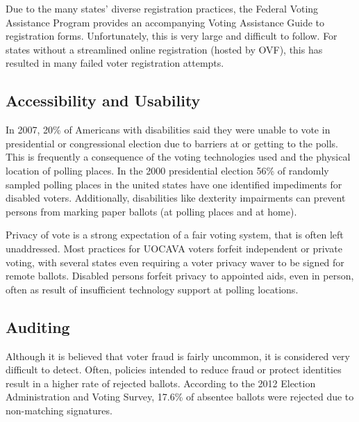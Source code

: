 
Due to the many states' diverse registration practices, the Federal Voting Assistance Program provides an accompanying Voting Assistance Guide to registration forms. Unfortunately, this is very large and difficult to follow. For states without a streamlined online registration (hosted by OVF), this has resulted in many failed voter registration attempts.


\subsection{Accessibility and Usability}

In 2007, 20\% of Americans with disabilities said they were unable to vote in presidential or congressional election due to barriers at or getting to the polls. This is frequently a consequence of the voting technologies used and the physical location of polling places. In the 2000 presidential election 56\% of randomly sampled polling places in the united states have one identified impediments for disabled voters. Additionally, disabilities like dexterity impairments can prevent persons from marking paper ballots (at polling places and at home).

Privacy of vote is a strong expectation of a fair voting system, that is often left unaddressed. Most practices for UOCAVA voters forfeit independent or private voting, with several states even requiring a voter privacy waver to be signed for remote ballots. Disabled persons forfeit privacy to appointed aids, even in person, often as result of insufficient technology support at polling locations. 


\subsection{Auditing}
Although it is believed that voter fraud is fairly uncommon, it is considered very difficult to detect. Often, policies intended to reduce fraud or protect identities result in a higher rate of rejected ballots. According to the 2012 Election Administration and Voting Survey, 17.6\% of absentee ballots were rejected due to non-matching signatures.

